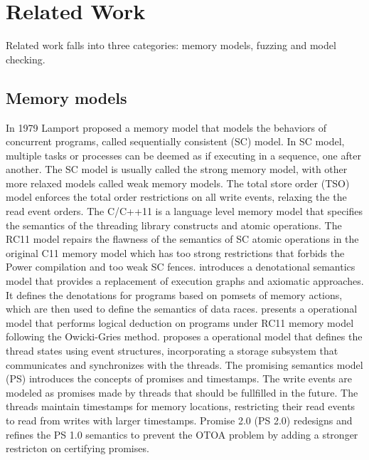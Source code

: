 \chapter{\label{cha:related}Related Work}

Related work falls into three categories: memory models, fuzzing and model checking.


\section{Memory models}

In 1979 Lamport\cite{SC} proposed a memory model that models the behaviors of concurrent programs, called sequentially consistent (SC) model. In SC model, multiple tasks or processes can be deemed as if executing in a sequence, one after another. The SC model is usually called the strong memory model, with other more relaxed models called weak memory models. The total store order (TSO) model\cite{TSO} enforces the total order restrictions on all write events, relaxing the the read event orders. The C/C++11\cite{c++model} is a language level memory model that specifies the semantics of the threading library constructs and atomic operations. 
The RC11 model\cite{RC11} repairs the flawness of the semantics of SC atomic operations in the original C11 memory model which has too strong restrictions that forbids the Power compilation and too weak SC fences.
\cite{Kavanagh2018ADA} introduces a denotational semantics model that provides a replacement of execution graphs and axiomatic approaches. It defines the denotations for programs based on pomsets of memory actions, which are then used to define the semantics of data races.
\cite{Owicki-Gries} presents a operational model that performs logical deduction on programs under RC11 memory model following the Owicki-Gries method. 
\cite{wmm2016} proposes a operational model that defines the thread states using event structures, incorporating a storage subsystem that communicates and synchronizes with the threads. 
The promising semantics model (PS)\cite{promise-c++model} introduces the concepts of promises and timestamps. The write events are modeled as promises made by threads that should be fullfilled in the future. The threads maintain timestamps for memory locations, restricting their read events to read from writes with larger timestamps. Promise 2.0 (PS 2.0)\cite{promise2.0-c++model} redesigns and refines the PS 1.0 semantics to prevent the OTOA problem by adding a stronger restricton on certifying promises. 



